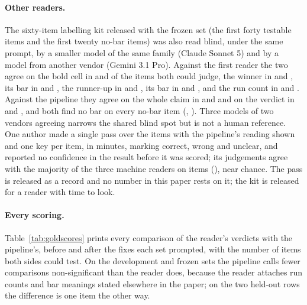 \documentclass{article}
\begin{document}
\paragraph{Other readers.} The sixty-item labelling kit released with the
frozen set (the first forty testable items and the first twenty no-bar items)
was also read blind, under the same prompt, by a smaller model of the same
family (Claude Sonnet 5) and by a model from another vendor (Gemini 3.1 Pro).
Against the first reader the two agree on the bold cell in
\nReadersAgreeBold{} and \nReadersThreeAgreeBold{} of the items both could
judge, the winner in \nReadersAgreeWinner{} and \nReadersThreeAgreeWinner{},
its bar in \nReadersAgreeWinnerDisp{} and \nReadersThreeAgreeWinnerDisp{},
the runner-up in \nReadersAgreeRunner{} and \nReadersThreeAgreeRunner{}, its
bar in \nReadersAgreeRunnerDisp{} and \nReadersThreeAgreeRunnerDisp{}, and
the run count in \nReadersAgreeRuns{} and \nReadersThreeAgreeRuns{}. Against
the pipeline they agree on the whole claim in \nReaderTwoClaimFrac{} and
\nReaderThreeClaimFrac{} and on the verdict in \nReaderTwoAgree{} and
\nReaderThreeAgree{}, and both find no bar on every no-bar item
(\nReaderTwoNoBarAbsentFrac{}, \nReaderThreeNoBarAbsentFrac{}). Three models
of two vendors agreeing narrows the shared blind spot but is not a human
reference. One author made a single pass over the \nHumanPassN{} items with
the pipeline's reading shown and one key per item, in \nHumanPassMinutes{}
minutes, marking \nHumanPassCorrect{} correct, \nHumanPassWrong{} wrong and
\nHumanPassUnclear{} unclear, and reported no confidence in the result
before it was scored; its judgements agree with the majority of the three
machine readers on \nHumanPassAgreeFrac{} items (\nHumanPassAgree{}), near
chance. The pass is released as a record and no number in this paper rests
on it; the kit is released for a reader with time to look.

\paragraph{Every scoring.} Table~\ref{tab:goldscores} prints every
comparison of the reader's verdicts with the pipeline's, before and after the
fixes each set prompted, with the number of items both sides could test. On
the development and frozen sets the pipeline calls fewer comparisons
non-significant than the reader does, because the reader attaches run counts
and bar meanings stated elsewhere in the paper; on the two held-out rows the
difference is one item the other way.
\end{document}
